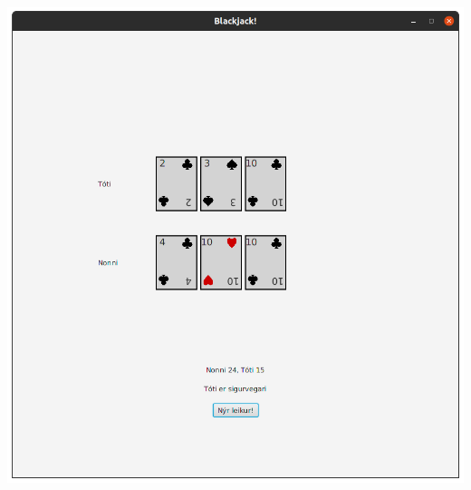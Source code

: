 \documentclass{article}
\begin{document}
\begin{center}
    \includegraphics[scale=0.17]{bj6.png}
\end{center}
\end{document}
